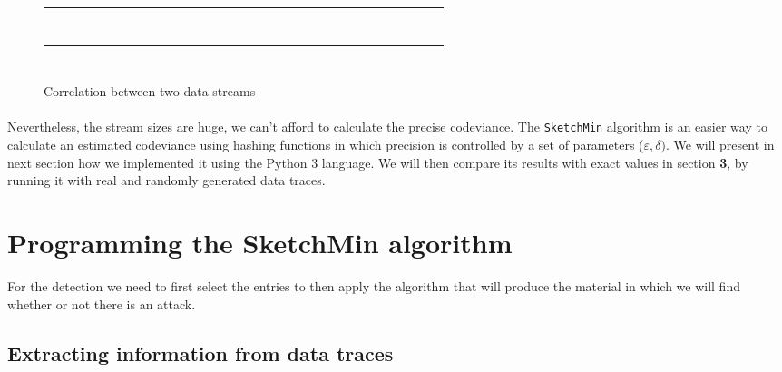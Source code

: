\documentclass[a4paper]{article}%
\begin{document}
\begin{figure}[H]
	
	\begin{center}\begin{tabular}{|c|c|c|c|c|c|c|c|c|c|c|c|c|c|c|c|c|c|c|c|}
		\hline
		~ & ~ & \cellcolor{purple}~ & ~ & \cellcolor{purple}~ & ~ & ~ & \cellcolor{purple}~ & ~ & ~ & \cellcolor{purple}~ & ~ & ~ & ~ & ~ & ~ & ~ &\cellcolor{purple}~ & ~ & ~ \\
		\hline
	\end{tabular}\end{center}
		
	\begin{center}\begin{tabular}{|c|c|c|c|c|c|c|c|c|c|c|c|c|c|c|c|c|c|c|c|}
		\hline
		\cellcolor{purple}~ & ~ & ~ & ~ & \cellcolor{purple}~ & ~ & \cellcolor{purple}~ & ~ & ~ & ~ & \cellcolor{purple}~ & ~ & ~ & ~ & \cellcolor{purple}~ & ~ & ~ & ~ & \cellcolor{purple}~ & ~ \\
		\hline
	\end{tabular}\end{center}
	\caption{\scriptsize Correlation between two data streams}
\end{figure}

\paragraph{}Nevertheless, the stream sizes are huge, we can't afford to calculate the precise codeviance. The \texttt{SketchMin} algorithm is an easier way to calculate an estimated codeviance using hashing functions in which precision is controlled by a set of parameters ($\varepsilon, \delta)$. We will present in next section how we implemented it using the Python 3 language. We will then compare its results with exact values in section \textbf{3}, by running it with real and randomly generated data traces.


\section{Programming the SketchMin algorithm}

For the detection we need to first select the entries to then apply the algorithm that will produce the material in which we will find whether or not there is an attack.

\subsection{Extracting information from data traces}
\end{document}
